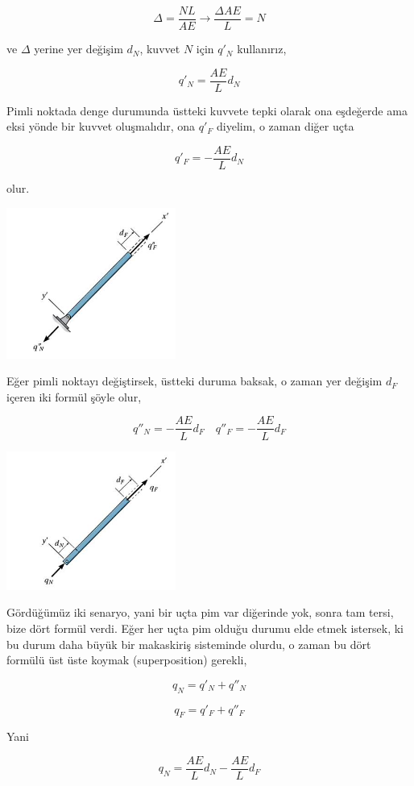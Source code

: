 \documentclass[12pt,fleqn]{article}\usepackage{../../common}
\begin{document}
$$
\Delta = \frac{NL}{AE} \to \frac{\Delta AE}{L} = N
$$

ve $\Delta$ yerine yer değişim $d_N$, kuvvet $N$ için $q'_N$ kullanırız,

$$
q'_N = \frac{AE}{L} d_N
$$

Pimli noktada denge durumunda üstteki kuvvete tepki olarak ona eşdeğerde ama
eksi yönde bir kuvvet oluşmalıdır, ona $q'_F$ diyelim, o zaman diğer uçta

$$
q'_F = -\frac{AE}{L} d_N
$$

olur.

\includegraphics[width=15em]{phy_020_strs_05_07.jpg}

Eğer pimli noktayı değiştirsek, üstteki duruma baksak, o zaman yer değişim
$d_F$ içeren iki formül şöyle olur,

$$
q''_N = - \frac{AE}{L} d_F \quad
q''_F = - \frac{AE}{L} d_F 
$$

\includegraphics[width=15em]{phy_020_strs_05_08.jpg}

Gördüğümüz iki senaryo, yani bir uçta pim var diğerinde yok, sonra tam tersi,
bize dört formül verdi. Eğer her uçta pim olduğu durumu elde etmek istersek, ki
bu durum daha büyük bir makaskiriş sisteminde olurdu, o zaman bu dört formülü
üst üste koymak (superposition) gerekli,

$$
q_N = q'_N + q''_N 
$$

$$
q_F = q'_F + q''_F
$$

Yani

$$
q_N = \frac{AE}{L} d_N - \frac{AE}{L} d_F
$$
\end{document}
